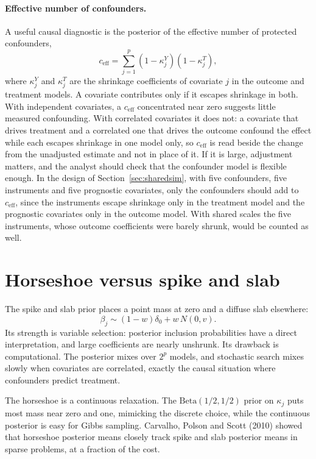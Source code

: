 \paragraph{Effective number of confounders.}
A useful causal diagnostic is the posterior of the effective number of protected confounders,
\[
c_{\mathrm{eff}} = \sum_{j=1}^p (1 - \kappa_j^{Y})(1 - \kappa_j^{T}),
\]
where $\kappa_j^Y$ and $\kappa_j^T$ are the shrinkage coefficients of covariate $j$ in the outcome and treatment models. A covariate contributes only if it escapes shrinkage in both. With independent covariates, a $c_{\mathrm{eff}}$ concentrated near zero suggests little measured confounding. With correlated covariates it does not: a covariate that drives treatment and a correlated one that drives the outcome confound the effect while each escapes shrinkage in one model only, so $c_{\mathrm{eff}}$ is read beside the change from the unadjusted estimate and not in place of it. If it is large, adjustment matters, and the analyst should check that the confounder model is flexible enough. In the design of Section~\ref{sec:sharedsim}, with five confounders, five instruments and five prognostic covariates, only the confounders should add to $c_{\mathrm{eff}}$, since the instruments escape shrinkage only in the treatment model and the prognostic covariates only in the outcome model. With shared scales the five instruments, whose outcome coefficients were barely shrunk, would be counted as well.



\section{Horseshoe versus spike and slab}

The spike and slab prior places a point mass at zero and a diffuse slab elsewhere:
\[
\beta_j \sim (1 - w)\delta_0 + w\,N(0, v).
\]
Its strength is variable selection: posterior inclusion probabilities have a direct interpretation, and large coefficients are nearly unshrunk. Its drawback is computational. The posterior mixes over $2^p$ models, and stochastic search mixes slowly when covariates are correlated, exactly the causal situation where confounders predict treatment.

The horseshoe is a continuous relaxation. The $\mathrm{Beta}(1/2, 1/2)$ prior on $\kappa_j$ puts most mass near zero and one, mimicking the discrete choice, while the continuous posterior is easy for Gibbs sampling. Carvalho, Polson and Scott (2010) showed that horseshoe posterior means closely track spike and slab posterior means in sparse problems, at a fraction of the cost.

